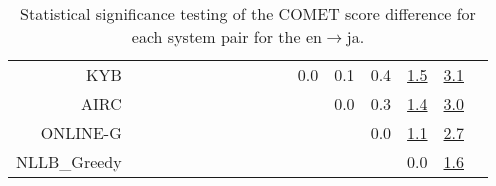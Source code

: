 \documentclass[11pt]{article}
\begin{document}
\begin{sidewaystable}
\begin{center}
{\begin{tabular}{rcccccccccccccccc}
KYB &  &  &  &    &  &  &  &  &  &  & \cellcolor{red!0} 0.0 & \cellcolor{red!0} 0.1 & \cellcolor{red!0} 0.4 & \cellcolor{red!70} \underline{1.5} & \cellcolor{red!70} \underline{3.1}\\ 
AIRC &  &  &    &  &  &  &  &  &  &  &  & \cellcolor{red!0} 0.0 & \cellcolor{red!0} 0.3 & \cellcolor{red!70} \underline{1.4} & \cellcolor{red!70} \underline{3.0}\\ 
ONLINE-G &  &  &    &  &  &  &  &  &  &  &  &  & \cellcolor{red!0} 0.0 & \cellcolor{red!70} \underline{1.1} & \cellcolor{red!70} \underline{2.7}\\ 
NLLB\_Greedy &  &  &    &  &  &  &  &  &  &  &  &  &  & \cellcolor{red!0} 0.0 & \cellcolor{red!70} \underline{1.6}\\ 
\bottomrule 
\end{tabular} }
\caption{Statistical significance testing of the COMET score difference for each system pair for the en$\rightarrow$ja.} 
 \end{center} \end{sidewaystable} 
\end{document}
